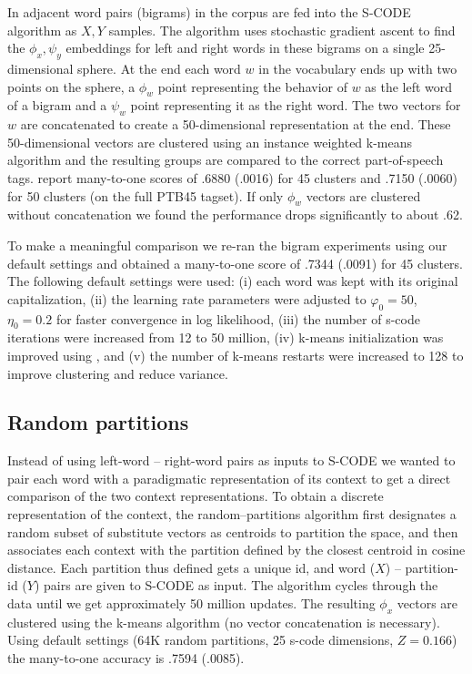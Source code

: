\documentclass[11pt]{article}
\begin{document}
In \cite{maron2010sphere} adjacent word pairs (bigrams) in the corpus
are fed into the S-CODE algorithm as $X, Y$ samples.  The algorithm
uses stochastic gradient ascent to find the $\phi_x, \psi_y$
embeddings for left and right words in these bigrams on a single
25-dimensional sphere.  At the end each word $w$ in the vocabulary
ends up with two points on the sphere, a $\phi_w$ point representing
the behavior of $w$ as the left word of a bigram and a $\psi_w$ point
representing it as the right word.  The two vectors for $w$ are
concatenated to create a 50-dimensional representation at the end.
These 50-dimensional vectors are clustered using an instance weighted
k-means algorithm and the resulting groups are compared to the correct
part-of-speech tags.  \cite{maron2010sphere} report many-to-one scores
of .6880 (.0016) for 45 clusters and .7150 (.0060) for 50 clusters (on
the full PTB45 tagset).  If only $\phi_w$ vectors are clustered
without concatenation we found the performance drops significantly to
about .62.

To make a meaningful comparison we re-ran the bigram experiments using
our default settings and obtained a many-to-one score of .7344 (.0091)
for 45 clusters.  The following default settings were used: (i) each
word was kept with its original capitalization, (ii) the learning rate
parameters were adjusted to $\varphi_0=50$, $\eta_0=0.2$ for faster
convergence in log likelihood, (iii) the number of s-code iterations
were increased from 12 to 50 million, (iv) k-means initialization was
improved using \cite{arthur2007k}, and (v) the number of k-means
restarts were increased to 128 to improve clustering and reduce
variance.

\subsection{Random partitions}\label{sec:rpart}

Instead of using left-word -- right-word pairs as inputs to S-CODE we
wanted to pair each word with a paradigmatic representation of its
context to get a direct comparison of the two context representations.
To obtain a discrete representation of the context, the
random--partitions algorithm first designates a random subset of
substitute vectors as centroids to partition the space, and then
associates each context with the partition defined by the closest
centroid in cosine distance.  Each partition thus defined gets a
unique id, and word ($X$) -- partition-id ($Y$) pairs are given to
S-CODE as input.  The algorithm cycles through the data until we get
approximately 50 million updates.  The resulting $\phi_x$ vectors are
clustered using the k-means algorithm (no vector concatenation is
necessary).  Using default settings (64K random partitions, 25 s-code
dimensions, $Z=0.166$) the many-to-one accuracy is .7594 (.0085).
\end{document}
